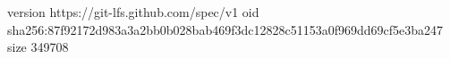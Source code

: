 version https://git-lfs.github.com/spec/v1
oid sha256:87f92172d983a3a2bb0b028bab469f3dc12828c51153a0f969dd69cf5e3ba247
size 349708
